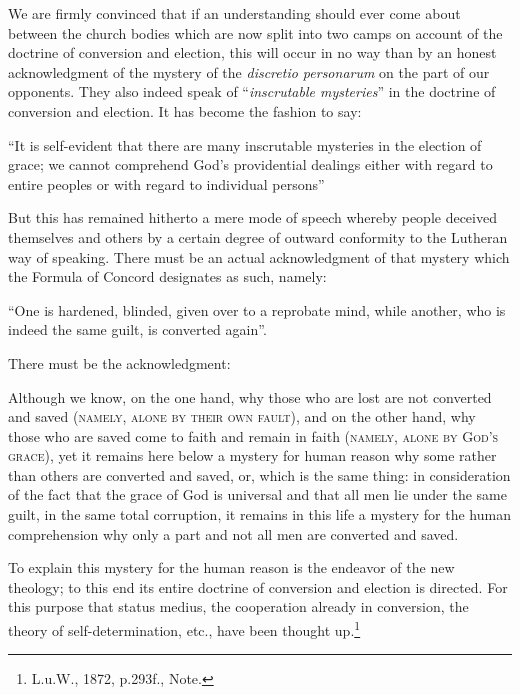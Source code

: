                 We are firmly convinced that if an understanding should ever come about between the church bodies which are now split into two camps on account of the doctrine of conversion and election, this will occur in no way than by an honest acknowledgment of the mystery of the \textit{discretio personarum} on the part of our opponents.  They also indeed speak of “\textit{inscrutable mysteries}” in the doctrine of conversion and election.  It has become the fashion to say: \begin{displayquote}{\footnotesize “It is self-evident that there are many inscrutable mysteries in the election of grace; we cannot comprehend God’s providential dealings either with regard to entire peoples or with regard to individual persons”}\end{displayquote}  But this has remained hitherto a mere mode of speech whereby people deceived themselves and others by a certain degree of outward conformity to the Lutheran way of speaking.  There must be an actual acknowledgment of that mystery which the Formula of Concord designates as such, namely: \begin{displayquote}{\footnotesize “One is hardened, blinded, given over to a reprobate mind, while another, who is indeed the same guilt, is converted again”.}\end{displayquote}  There must be the acknowledgment: \begin{displayquote}{\footnotesize  Although we know, on the one hand, why those who are lost are not converted and saved {\scriptsize\textsc{(namely, alone by their own fault)}}, and on the other hand, why those who are saved come to faith and remain in faith {\scriptsize\textsc{(namely, alone by God’s grace)}}, yet it remains here below a mystery for human reason why some rather than others are converted and saved, or, which is the same thing: in consideration of the fact that the grace of God is universal and that all men lie under the same guilt, in the same total corruption, it remains in this life a mystery for the human comprehension why only a part and not all men are converted and saved.}\end{displayquote} To explain this mystery for the human reason is the endeavor of the new theology; to this end its entire doctrine of conversion and election is directed.  For this purpose that status medius, the cooperation already in conversion, the theory of self-determination, etc., have been thought up.\footnote{L.u.W., 1872, p.293f., Note.}

